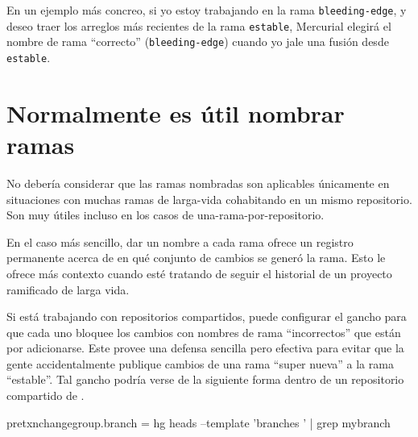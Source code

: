 En un ejemplo más concreo, si yo estoy trabajando en la rama
\texttt{bleeding-edge}, y deseo traer los arreglos más recientes de la
rama \texttt{estable}, Mercurial elegirá el nombre de rama ``correcto''
(\texttt{bleeding-edge}) cuando yo jale una fusión desde \texttt{estable}.

\section{Normalmente es útil nombrar ramas}

No debería considerar que las ramas nombradas son aplicables
únicamente en situaciones con muchas ramas de larga-vida cohabitando
en un mismo repositorio.  Son muy útiles incluso en los casos de
una-rama-por-repositorio.

En el caso más sencillo, dar un nombre a cada rama ofrece un registro
permanente acerca de en qué conjunto de cambios se generó la rama.
Esto le ofrece más contexto cuando esté tratando de seguir el
historial de un proyecto ramificado de larga vida.

Si está trabajando con repositorios compartidos, puede configurar el gancho
 para que cada uno bloquee los cambios con
nombres de rama ``incorrectos'' que están por adicionarse.  Este
provee una defensa sencilla pero efectiva para evitar que la gente
accidentalmente publique cambios de una rama ``super nueva'' a la rama
``estable''.  Tal gancho podría verse de la siguiente forma dentro de
un repositorio compartido de \hgrc.
\begin{codesample2}
  [hooks]
  pretxnchangegroup.branch = hg heads --template '{branches} ' | grep mybranch
\end{codesample2}

